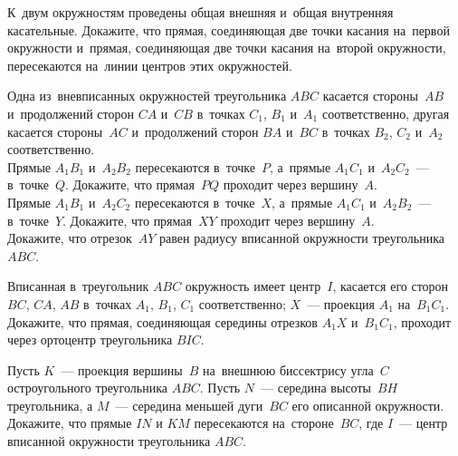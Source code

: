 


\begin{problems}

\item
К~двум окружностям проведены общая внешняя и~общая внутренняя касательные.
Докажите, что прямая, соединяющая две точки касания на~первой окружности
и~прямая, соединяющая две точки касания на~второй окружности, пересекаются
на~линии центров этих окружностей.

\item
Одна из~вневписанных окружностей треугольника $ABC$ касается стороны~$AB$
и~продолжений сторон $CA$ и~$CB$ в~точках $C_{1}$, $B_{1}$ и~$A_{1}$
соответственно, другая касается стороны~$AC$ и~продолжений сторон $BA$ и~$BC$
в~точках $B_{2}$, $C_{2}$ и~$A_{2}$ соответственно.
\\
\subproblem
Прямые $A_{1}B_{1}$ и~$A_{2}B_{2}$ пересекаются в~точке~$P$,
а~прямые $A_{1}C_{1}$ и~$A_{2}C_{2}$~--- в~точке~$Q$.
Докажите, что прямая~$PQ$ проходит через вершину~$A$.
\\
\subproblem
Прямые $A_{1}B_{1}$ и~$A_{2}C_{2}$ пересекаются в~точке~$X$,
а~прямые $A_{1}C_{1}$ и~$A_{2}B_{2}$~--- в~точке~$Y$.
Докажите, что прямая~$XY$ проходит через вершину~$A$.
\\
\subproblem
Докажите, что отрезок~$AY$ равен радиусу вписанной окружности
треугольника $ABC$.

\item
Вписанная в~треугольник $ABC$ окружность имеет центр~$I$, касается его
сторон $BC$, $CA$, $AB$ в~точках $A_{1}$, $B_{1}$, $C_{1}$ соответственно;
$X$~--- проекция $A_{1}$ на~$B_{1}C_{1}$.
Докажите, что прямая, соединяющая середины отрезков $A_{1}X$ и~$B_{1}C_{1}$,
проходит через ортоцентр треугольника $BIC$.

\item
Пусть $K$~--- проекция вершины~$B$ на~внешнюю биссектрису угла~$C$
остроугольного треугольника $ABC$.
Пусть $N$~--- середина высоты~$BH$ треугольника,
а $M$~--- середина меньшей дуги~$BC$ его описанной окружности.
Докажите, что прямые $IN$ и $KM$ пересекаются на~стороне~$BC$, где $I$~---
центр вписанной окружности треугольника $ABC$.

\end{problems}

